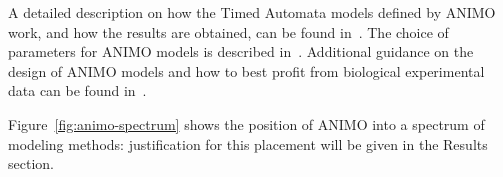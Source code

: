 \documentclass{bmcart}
\begin{document}
A detailed description on how the Timed Automata models defined by ANIMO work, and how the results are obtained, can be found in~\cite{animo-ieee}. The choice of parameters for ANIMO models is described in~\cite{animo-syncop}. Additional guidance on the design of ANIMO models and how to best profit from biological experimental data can be found in~\cite{animo-gene}.

Figure~\ref{fig:animo-spectrum} shows the position of ANIMO into a spectrum of modeling methods: justification for this placement will be given in the Results section.



%
\end{document}
